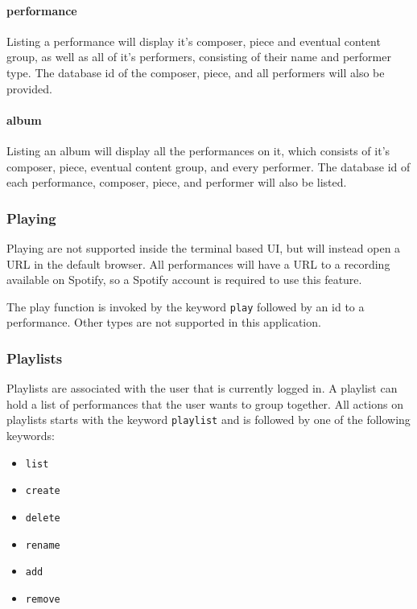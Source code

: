 \paragraph{performance}
Listing a performance will display it's composer, piece and eventual content group, as well as all
of it's performers, consisting of their name and performer type.
The database id of the composer, piece, and all performers will also be provided.

\paragraph{album}
Listing an album will display all the performances on it, which consists of it's composer, piece,
eventual content group, and every performer.
The database id of each performance, composer, piece, and performer will also be listed.

\subsubsection{Playing}
Playing are not supported inside the terminal based UI, but will instead open a URL in the default
browser. All performances will have a URL to a recording available on Spotify, so a Spotify account
is required to use this feature.

The play function is invoked by the keyword \texttt{play} followed by an id to a performance.
Other types are not supported in this application.

\subsubsection{Playlists}
Playlists are associated with the user that is currently logged in.
A playlist can hold a list of performances that the user wants to group together.
All actions on playlists starts with the keyword \texttt{playlist} and is followed by one of the
following keywords:
\begin{itemize}
    \item \texttt{list}
    \item \texttt{create}
    \item \texttt{delete}
    \item \texttt{rename}
    \item \texttt{add}
    \item \texttt{remove}
\end{itemize} 


